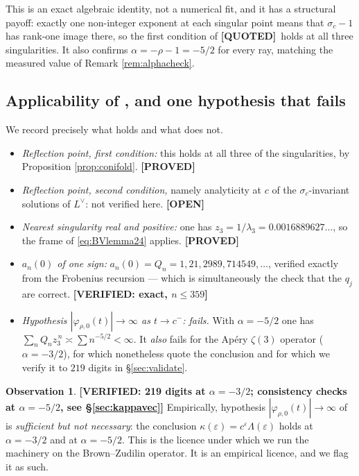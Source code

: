 \documentclass[11pt,reqno]{amsart}
\theoremstyle{plain}
\theoremstyle{definition}
\newtheorem{observation}[theorem]{Observation}
\theoremstyle{remark}
\newcommand{\PROVED}{{\normalfont\sffamily\bfseries[PROVED]}}
\newcommand{\VER}[1]{{\normalfont\sffamily\bfseries[VERIFIED: #1]}}
\newcommand{\OPEN}{{\normalfont\sffamily\bfseries[OPEN]}}
\newcommand{\QUOTEDMARK}{{\normalfont\sffamily\bfseries[QUOTED]}}
\newcommand{\QUOTED}[1]{\QUOTEDMARK\,#1}
\newcommand{\eps}{\varepsilon}
\begin{document}
This is an exact algebraic identity, not a numerical fit, and it has a structural payoff:
exactly one non-integer exponent at each singular point means that $\sigma_c-1$ has rank-one
image there, so the first condition of \QUOTED{\cite[Def.~21]{BV}} holds at all three
singularities. It also confirms $\alpha=-\rho-1=-5/2$ for every ray, matching the measured
value of Remark \ref{rem:alphacheck}.

\subsection{Applicability of \texorpdfstring{\cite[Def.~22]{BV}}{[BV, Def. 22]}, and one
hypothesis that fails}\label{sec:applic}
We record precisely what holds and what does not.

\begin{itemize}[leftmargin=1.6em]
\item \emph{Reflection point, first condition:} this holds at all three of the singularities,
by Proposition \ref{prop:conifold}. \PROVED
\item \emph{Reflection point, second condition,} namely analyticity at $c$ of the
$\sigma_c$-invariant solutions of $L^\vee$: not verified here. \OPEN
\item \emph{Nearest singularity real and positive:} one has
$z_3=1/\lambda_3=0.0016889627\ldots$, so the frame of \eqref{eq:BVlemma24} applies. \PROVED
\item \emph{$a_n(0)$ of one sign:} $a_n(0)=Q_n=1,21,2989,714549,\dots$, verified exactly from the
Frobenius recursion --- which is simultaneously the check that the $q_j$ are correct.
\VER{exact, $n\le359$}
\item \emph{Hypothesis $|\varphi_{\rho,0}(t)|\to\infty$ as $t\to c^-$: fails.} With
$\alpha=-5/2$ one has $\sum_nQ_nz_3^{\,n}\asymp\sum n^{-5/2}<\infty$. It \emph{also} fails for
the Ap\'ery $\zeta(3)$ operator ($\alpha=-3/2$), for which \cite{BV} nonetheless quote the
conclusion and for which we verify it to $219$ digits in \S\ref{sec:validate}.
\end{itemize}

\begin{observation}\label{obs:sufficient} \VER{219 digits at $\alpha=-3/2$; consistency checks
at $\alpha=-5/2$, see \S\ref{sec:kappavec}}
Empirically, hypothesis $|\varphi_{\rho,0}(t)|\to\infty$ of \cite[Lemma~24]{BV} is
\emph{sufficient but not necessary}: the conclusion $\kappa(\eps)=c^{\eps}\Lambda(\eps)$ holds at
$\alpha=-3/2$ and at $\alpha=-5/2$. This is the licence under which we run the machinery on the
Brown--Zudilin operator. It is an empirical licence, and we flag it as such.
\end{observation}
\end{document}
